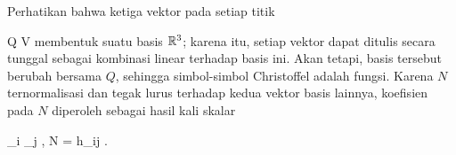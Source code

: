 Perhatikan bahwa ketiga vektor
pada setiap titik

\mavergleichskette
{\vergleichskette
{ Q
}
{ \in }{ V
}
{  }{
}
{    }{
}
{   }{
}
}
{}{}{}
membentuk suatu basis ${\mathbb R}^3$;
karena itu, setiap vektor dapat ditulis secara tunggal sebagai kombinasi linear terhadap basis ini. Akan tetapi, basis tersebut berubah bersama $Q$, sehingga simbol-simbol Christoffel adalah fungsi. Karena $N$ ternormalisasi dan tegak lurus terhadap kedua vektor basis lainnya, koefisien pada $N$ diperoleh sebagai hasil kali skalar

\mavergleichskette
{\vergleichskette
{ \left\langle  \partial_i \partial_j \varphi , N  \right\rangle
}
{ = }{ h_{ij}
}
{  }{
}
{    }{
}
{   }{
}
}
{}{}{.}




